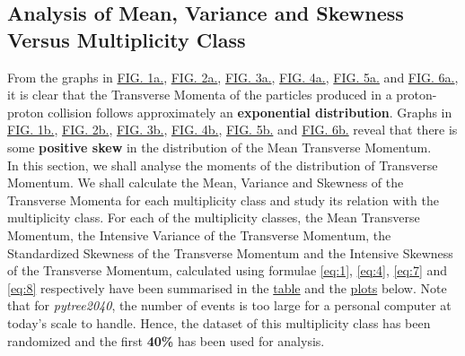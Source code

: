 \documentclass[letterpaper,aps,prc,superscriptaddress,nofootinbib,10pt,showpacs,floatfix]{revtex4-2}
\begin{document}
\subsection{Analysis of Mean, Variance and Skewness Versus Multiplicity Class}
From the graphs in \hyperref[Fig:1a]{FIG. 1a.}, \hyperref[Fig:2a]{FIG. 2a.}, \hyperref[Fig:3a]{FIG. 3a.}, \hyperref[Fig:4a]{FIG. 4a.}, \hyperref[Fig:5a]{FIG. 5a.} and \hyperref[Fig:6a]{FIG. 6a.}, it is clear that the Transverse Momenta of the particles produced in a proton-proton collision follows approximately an \textbf{exponential distribution}. Graphs in \hyperref[Fig:1b]{FIG. 1b.}, \hyperref[Fig:2b]{FIG. 2b.}, \hyperref[Fig:3b]{FIG. 3b.}, \hyperref[Fig:4b]{FIG. 4b.}, \hyperref[Fig:5b]{FIG. 5b.} and \hyperref[Fig:6b]{FIG. 6b.} reveal that there is some \textbf{positive skew} in the distribution of the Mean Transverse Momentum.
\\
In this section, we shall analyse the moments of the distribution of Transverse Momentum. We shall calculate the Mean, Variance and Skewness of the Transverse Momenta for each multiplicity class and study its relation with the multiplicity class. For each of the multiplicity classes, the Mean Transverse Momentum, the Intensive Variance of the Transverse Momentum, the Standardized Skewness of the Transverse Momentum and the Intensive Skewness of the Transverse Momentum, calculated using formulae \ref{eq:1}, \ref{eq:4}, \ref{eq:7} and \ref{eq:8} respectively have been summarised in the \hyperref[subsubsec:summary]{table} and the \hyperref[subsubsec:mean]{plots} below. Note that for \textit{pytree2040}, the number of events is too large for a personal computer at today's scale to handle. Hence, the dataset of this multiplicity class has been randomized and the first \textbf{40\%} has been used for analysis.

\pagebreak
\end{document}
